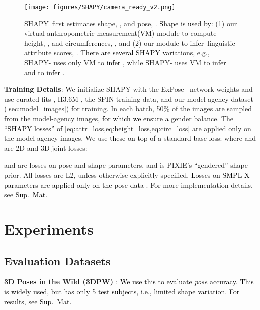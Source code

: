\documentclass[10pt,twocolumn,letterpaper]{article}
\newcommand{\qheading}[1]{\noindent\textbf{#1}:}
\newcommand{\modelCOLOR}{black}
\newcommand{\modelname}{{\color{\modelCOLOR}SHAPY}\xspace}
\newcommand{\colorattr}{\color{PineGreen}}
\newcommand{\colorheight}{\color{Bittersweet}}
\newcommand{\StoM}{VM\xspace}
\newcommand{\StoA}{\text{\mbox{S2A}}\xspace}
\newcommand{\shapyH}{\mbox{\modelname-{\colorheight{H}}}\xspace}
\newcommand{\shapyHA}{\mbox{\modelname-{\colorheight{H}\colorattr{A}}}\xspace}
\newcommand{\pixie}{\mbox{PIXIE}\xspace}
\newcommand{\expose}{\mbox{ExPose}\xspace}
\newcommand{\twoD}{2D\xspace}
\newcommand{\threeD}{3D\xspace}
\newcommand{\smplx}{\mbox{SMPL-X}\xspace}
\newcommand{\supmat}{{\mbox{\textcolor{black}{Sup.~Mat.}}}\xspace}
\newcommand{\threedpw}{\mbox{3DPW}\xspace}
\renewcommand{\ie}{\mbox{i.e.}\xspace}
\renewcommand{\eg}{\mbox{e.g.}\xspace}
\newcommand{\cameraready}[1]{\textcolor{Fuchsia}{{#1}}\xspace}
\renewcommand{\cameraready}[1]{\textcolor{black}{{#1}}\xspace}
\newcommand{\colorTERM}{blue}
\renewcommand{\colorTERM}{black}
\newcommand{\measurement}[0]{{\color{\colorTERM}anthropometric measurement}\xspace}
\newcommand{\scores}[0]{{scores}\xspace}
\newcommand{\linguisticattributescores}[0]{{\color{\colorTERM}linguistic attribute \scores}\xspace}
\begin{document}
\begin{figure}
    \centering
    \texttt{[image: figures/SHAPY/camera\_ready\_v2.png]}
    \caption{\modelname~first estimates shape, \cameraready{}, and pose, \cameraready{}. 
        \cameraready{Shape} 
        is \cameraready{used by:} (1) our virtual \measurement \cameraready{(\StoM)} module to compute height, , and \cameraready{circumferences}, , and 
        (2) our \StoA module to \cameraready{infer}~\linguisticattributescores, .
        \cameraready{There are several \modelname variations}, \eg, 
        \shapyH uses only \StoM to \cameraready{infer} , while 
        \shapyHA uses \StoM to \cameraready{infer}  and \StoA to \cameraready{infer} .
    }
    \label{fig:shapy_ah1}
\end{figure} 
\smallskip
\qheading{Training Details}
We initialize \modelname with the \expose~\cite{Choutas2020_expose} network weights and use curated fits \cite{Choutas2020_expose}, H3.6M \cite{ionescu2013human36m}, the SPIN \cite{Kolotouros2019_spin} training data, and our model-agency dataset (\cref{sec:model_images}) for training.
In each batch, 50\% of the images are sampled from the model-agency images,
\cameraready{for which we ensure a} gender balance.
The 
\cameraready{``\modelname losses'' of \cref{eq:attr_loss,eq:height_loss,eq:circ_loss}} 
are 
applied only on the model-agency images. 
We use \cameraready{these on top of} a standard \cameraready{base loss:} 
where 
 and  are \twoD and \threeD joint losses:

             and 
            are losses on pose and shape parameters, and 
 is \pixie's \cite{feng2021pixie} ``gendered'' shape prior.
All losses are L2, unless otherwise explicitly specified.
\cameraready{Losses on \smplx parameters are applied only on the 
pose data \mbox{\cite{ionescu2013human36m,Choutas2020_expose,Kolotouros2019_spin}}.}
For more implementation details, see \supmat
 \section{Experiments}
\label{sec:experiments}

\subsection{Evaluation Datasets}     \label{sec:exp_datasets}




\qheading{\threeD Poses in the Wild (\threedpw) \cite{vonMarcard2018}}
\cameraready{We use this to evaluate \emph{pose} accuracy. 
This is widely used, but has only 5 test subjects, \ie, limited shape variation. 
For results, see \supmat}
\end{document}
